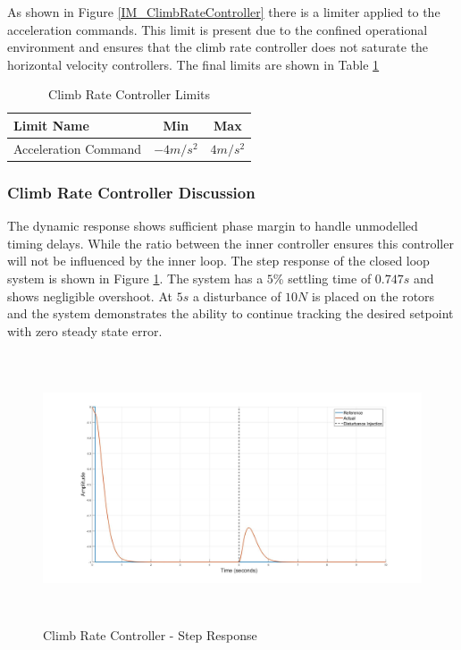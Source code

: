 	 As shown in Figure \ref{IM_ClimbRateController} there is a limiter applied to the acceleration commands. This limit is present due to the confined operational environment and ensures that the climb rate controller does not saturate the horizontal velocity controllers. The final limits are shown in Table \ref{tab:ClimbrateLimits}
	 
	 \begin{table}[!]
	 	\centering
	 	\begin{tabular}{l | c | c |}
	 		Limit Name 						& Min & Max\\
	 		\hline\hline
	 		Acceleration Command 		    & $-4m/s^{2}$ & $4m/s^{2}$ \\
	 	\end{tabular}
	 	\caption{Climb Rate Controller Limits}
	 	\label{tab:ClimbrateLimits}
	 \end{table}
	 
		 \subsubsection{Climb Rate Controller Discussion}
		 The dynamic response shows sufficient phase margin to handle unmodelled timing delays. While the ratio between the inner controller ensures this controller will not be influenced by the inner loop. The step response of the closed loop system is shown in Figure \ref{IM_ClimbRateStep}. The system has a $5$\% settling time of $0.747s$ and shows negligible overshoot. At $5s$ a disturbance of $10N$ is placed on the rotors and the system demonstrates the ability to continue tracking the desired setpoint with zero steady state error.
		 
		 \begin{figure}[H]
		 	\centering
		 	\includegraphics[height = 8cm]{../Design/Matlab/Controllers/climb_rate_step.jpg}
		 	\caption{Climb Rate Controller -  Step Response}
		 	\label{IM_ClimbRateStep}
		 \end{figure}
	 
